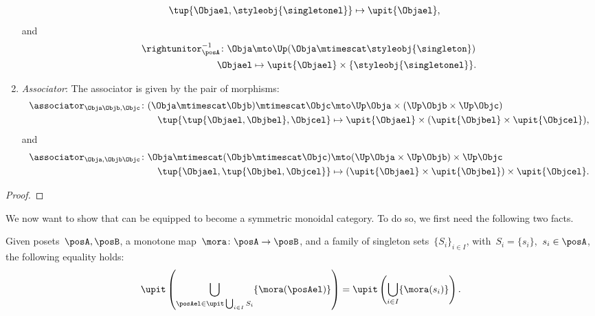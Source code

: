 \begin{lemma}
\begin{enumerate}
\begin{equation}
\begin{aligned}
            \tup{\Objael,\styleobj{\singletonel}}&\mapsto \upit\{\Objael\},
        \end{aligned}
    \end{equation}
    and
    \begin{equation}
        \begin{aligned}
            \rightunitor_\posA^{-1}\colon \Obja &\mto \Up( \Obja \mtimescat \styleobj{\singleton}) \\
            \Objael&\mapsto \upit \{\Objael\} \times \{\styleobj{\singletonel}\}.
        \end{aligned}
    \end{equation}
    \item \emph{Associator}: The associator is given by the pair of morphisms:
    \begin{equation}
        \begin{aligned}
            \associator_{\Obja\Objb,\Objc}\colon (\Obja\mtimescat \Objb)\mtimescat \Objc &\mto \Up \Obja\times (\Up \Objb \times \Up \Objc)\\
            \tup{\tup{\Objael,\Objbel},\Objcel}&\mapsto \upit\{\Objael\}\times (\upit\{\Objbel\}\times \upit\{\Objcel\}),
        \end{aligned}
    \end{equation}
    and
    \begin{equation}
        \begin{aligned}
            \associator_{\Obja,\Objb\Objc}\colon \Obja\mtimescat (\Objb\mtimescat \Objc) &\mto (\Up \Obja\times \Up \Objb) \times \Up \Objc\\
            \tup{\Objael,\tup{\Objbel,\Objcel}}&\mapsto (\upit\{\Objael\}\times \upit\{\Objbel\})\times \upit\{\Objcel\}.
        \end{aligned}
    \end{equation}
\end{enumerate}
\end{lemma}
\begin{proof}
\end{proof}

We now want to show that \UPos can be equipped to become a symmetric monoidal category.
To do so, we first need the following two facts.

\begin{lemma}
  \label{lem:unpack_u_functor}
  Given posets~$\posA,\posB$, a monotone map~$\mora \colon \posA \to \posB$, and a family of singleton sets~$\{S_i\}_{i\in I}$, with~$S_i=\{s_i\}$,~$s_i\in \posA$, the following equality holds:
  \begin{equation}
    \label{eq:lemma_unpack}
    \upit \left( \bigcup_{\posAel \in \upit \bigcup_{i\in I}S_i}\{\mora(\posAel)\}\right)= \upit \left( \bigcup_{i\in I} \{\mora(s_i)\}\right).
  \end{equation}
\end{lemma}


